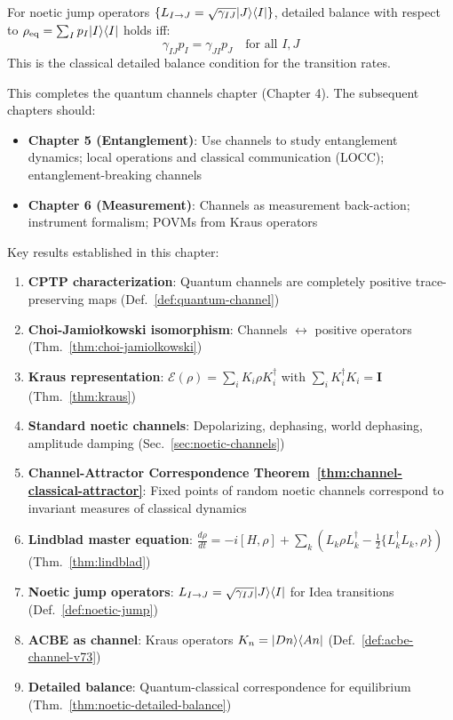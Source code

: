 \begin{theorem}
\label{thm:noetic-detailed-balance}
For noetic jump operators $\{L_{I \to J} = \sqrt{\gamma_{IJ}} |J\rangle\langle I|\}$, detailed balance with respect to $\rho_{\mathrm{eq}} = \sum_I p_I |I\rangle\langle I|$ holds iff:
\[
\gamma_{IJ} p_I = \gamma_{JI} p_J \quad \text{for all } I, J
\]
This is the classical detailed balance condition for the transition rates.
\end{theorem}

\begin{tcolorbox}[colback=green!5!white,colframe=green!50!black,title=\textbf{Handoff: Next Steps},breakable]
This completes the quantum channels chapter (Chapter 4). The subsequent chapters should:
\begin{itemize}
  \item \textbf{Chapter 5 (Entanglement)}: Use channels to study entanglement dynamics; local operations and classical communication (LOCC); entanglement-breaking channels
  \item \textbf{Chapter 6 (Measurement)}: Channels as measurement back-action; instrument formalism; POVMs from Kraus operators
\end{itemize}

Key results established in this chapter:
\begin{enumerate}
  \item \textbf{CPTP characterization}: Quantum channels are completely positive trace-preserving maps (Def.~\ref{def:quantum-channel})
  \item \textbf{Choi-Jamio\l{}kowski isomorphism}: Channels $\leftrightarrow$ positive operators (Thm.~\ref{thm:choi-jamiolkowski})
  \item \textbf{Kraus representation}: $\mathcal{E}(\rho) = \sum_i K_i \rho K_i^\dagger$ with $\sum_i K_i^\dagger K_i = \mathbf{I}$ (Thm.~\ref{thm:kraus})
  \item \textbf{Standard noetic channels}: Depolarizing, dephasing, world dephasing, amplitude damping (Sec.~\ref{sec:noetic-channels})
  \item \textbf{Channel-Attractor Correspondence Theorem~\ref{thm:channel-classical-attractor}}: Fixed points of random noetic channels correspond to invariant measures of classical dynamics
  \item \textbf{Lindblad master equation}: $\frac{d\rho}{dt} = -i[H,\rho] + \sum_k (L_k \rho L_k^\dagger - \frac{1}{2}\{L_k^\dagger L_k, \rho\})$ (Thm.~\ref{thm:lindblad})
  \item \textbf{Noetic jump operators}: $L_{I \to J} = \sqrt{\gamma_{IJ}}|J\rangle\langle I|$ for Idea transitions (Def.~\ref{def:noetic-jump})
  \item \textbf{ACBE as channel}: Kraus operators $K_n = |Dn\rangle\langle An|$ (Def.~\ref{def:acbe-channel-v73})
  \item \textbf{Detailed balance}: Quantum-classical correspondence for equilibrium (Thm.~\ref{thm:noetic-detailed-balance})
\end{enumerate}


\end{tcolorbox}
